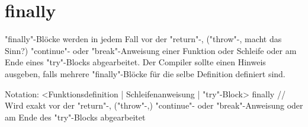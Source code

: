 \chapter{finally}

"finally"-Blöcke werden in jedem Fall vor der "return"-, ("throw"-, macht das Sinn?)  "continue"- oder "break"-Anweisung einer Funktion oder Schleife oder
am Ende eines "try"-Blocks abgearbeitet.
Der Compiler sollte einen Hinweis ausgeben, falls mehrere "finally"-Blöcke für die selbe Definition definiert sind.

Notation:
<Funktionsdefinition | Schleifenanweisung | "try"-Block>
finally // Wird exakt vor der "return"-, ("throw"-,) "continue"- oder "break"-Anweisung oder am Ende des "try"-Blocks abgearbeitet
{
} 
